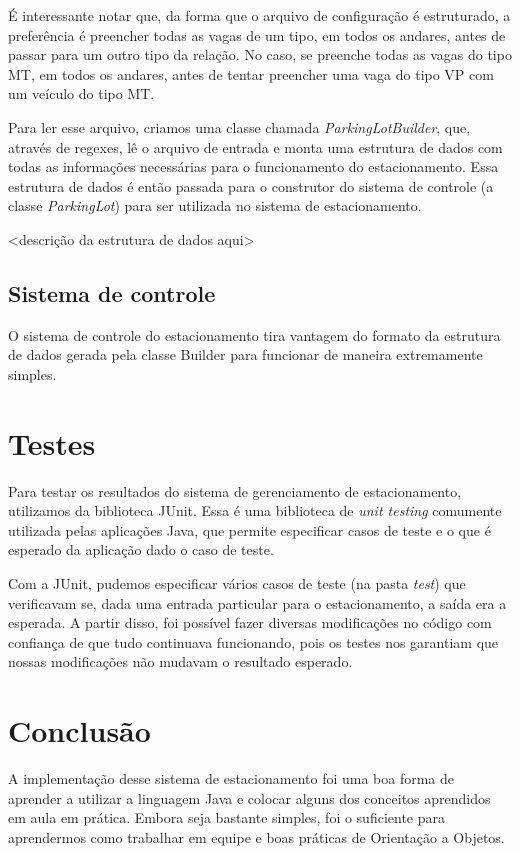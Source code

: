 \documentclass{article}
\begin{document}
É interessante notar que, da forma que o arquivo de configuração é estruturado, a preferência é preencher todas as vagas de um tipo, em todos os andares, antes de passar para um outro tipo da relação. No caso, se preenche todas as vagas do tipo MT, em todos os andares, antes de tentar preencher uma vaga do tipo VP com um veículo do tipo MT.

Para ler esse arquivo, criamos uma classe chamada \emph{ParkingLotBuilder}, que, através de regexes, lê o arquivo de entrada e monta uma estrutura de dados com todas as informações necessárias para o funcionamento do estacionamento. Essa estrutura de dados é então passada para o construtor do sistema de controle (a classe \emph{ParkingLot}) para ser utilizada no sistema de estacionamento.

<descrição da estrutura de dados aqui>

\subsection{Sistema de controle}
O sistema de controle do estacionamento tira vantagem do formato da estrutura de dados gerada pela classe Builder para funcionar de maneira extremamente simples.

\section{Testes}
Para testar os resultados do sistema de gerenciamento de estacionamento, utilizamos da biblioteca JUnit. Essa é uma biblioteca de \emph{unit testing} comumente utilizada pelas aplicações Java, que permite especificar casos de teste e o que é esperado da aplicação dado o caso de teste.

Com a JUnit, pudemos especificar vários casos de teste (na pasta \emph{test}) que verificavam se, dada uma entrada particular para o estacionamento, a saída era a esperada. A partir disso, foi possível fazer diversas modificações no código com confiança de que tudo continuava funcionando, pois os testes nos garantiam que nossas modificações não mudavam o resultado esperado.

\section{Conclusão}
A implementação desse sistema de estacionamento foi uma boa forma de aprender a utilizar a linguagem Java e colocar alguns dos conceitos aprendidos em aula em prática. Embora seja bastante simples, foi o suficiente para aprendermos como trabalhar em equipe e boas práticas de Orientação a Objetos.

\nocite{*}


\end{document}
